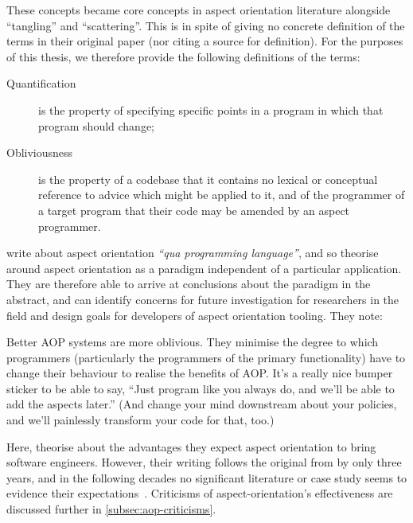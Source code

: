 These concepts became core concepts in aspect orientation literature alongside
``tangling'' and ``scattering''. This is in spite of
\citeauthor{filman2000aspect} giving no concrete definition of the terms in
their original paper (nor citing a source for definition). For the purposes of
this thesis, we therefore provide the following definitions of the terms:

\begin{description}
  \item[Quantification] is the property of specifying specific points in a
  program in which that program should change;
\item[Obliviousness] is the property of a codebase that it contains no lexical
  or conceptual reference to advice which might be applied to it, and of the
  programmer of a target program that their code may be amended by an aspect
  programmer.
\end{description}

\citeauthor{filman2000aspect} write about aspect orientation \emph{``qua
  programming language''}, and so theorise around aspect orientation as a
paradigm independent of a particular application. They are therefore able to
arrive at conclusions about the paradigm in the abstract, and can identify
concerns for future investigation for researchers in the field and design goals
for developers of aspect orientation tooling. They note:

\begin{displayquote}
  Better AOP systems are more oblivious. They minimise the degree to which
  programmers (particularly the programmers of the primary functionality) have
  to change their behaviour to realise the benefits of AOP. It's a really nice
  bumper sticker to be able to say, ``Just program like you always do, and we'll
  be able to add the aspects later.'' (And change your mind downstream about
  your policies, and we'll painlessly transform your code for that,
  too.)~\cite{filman2000aspect}
\end{displayquote}

Here, \citeauthor{filman2000aspect} theorise about the advantages they expect
aspect orientation to bring software engineers. However, their writing follows
the original from \citet{kiczales1997aspect} by only three years, and in the
following decades no significant literature or case study seems to evidence
their expectations~\citep{steimann06paradoxical}. Criticisms of
aspect-orientation's effectiveness are discussed further in
\cref{subsec:aop-criticisms}.

